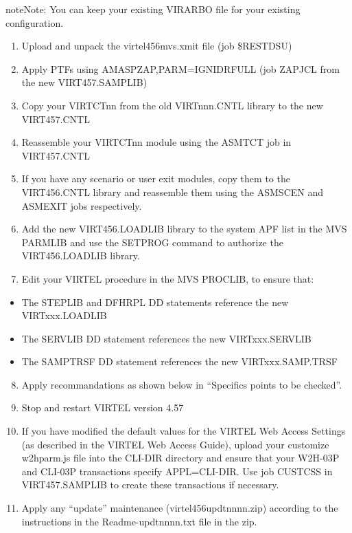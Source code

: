 \documentclass[letterpaper,10pt,english]{sphinxmanual}
\begin{document}
\begin{sphinxadmonition}{note}{Note:}
You can keep your existing VIRARBO file for your existing configuration.
\end{sphinxadmonition}
\begin{enumerate}
\item {} 
Upload and unpack the virtel456mvs.xmit file (job \$RESTDSU)

\item {} 
Apply PTFs using AMASPZAP,PARM=IGNIDRFULL (job ZAPJCL from the new VIRT457.SAMPLIB)

\item {} 
Copy your VIRTCTnn from the old VIRTnnn.CNTL library to the new VIRT457.CNTL

\item {} 
Reassemble your VIRTCTnn module using the ASMTCT job in VIRT457.CNTL

\item {} 
If you have any scenario or user exit modules, copy them to the VIRT456.CNTL library and reassemble them using the ASMSCEN and ASMEXIT jobs respectively.

\item {} 
Add the new VIRT456.LOADLIB library to the system APF list in the MVS PARMLIB and use the SETPROG command to authorize the VIRT456.LOADLIB library.

\item {} 
Edit your VIRTEL procedure in the MVS PROCLIB, to ensure that:

\end{enumerate}
\begin{itemize}
\item {} 
The STEPLIB and DFHRPL DD statements reference the new VIRTxxx.LOADLIB

\item {} 
The SERVLIB DD statement references the new VIRTxxx.SERVLIB

\item {} 
The SAMPTRSF DD statement references the new VIRTxxx.SAMP.TRSF

\end{itemize}
\begin{enumerate}
\setcounter{enumi}{7}
\item {} 
Apply recommandations as shown below in “Specifics points to be checked”.

\item {} 
Stop and restart VIRTEL version 4.57

\item {} 
If you have modified the default values for the VIRTEL Web Access Settings (as described in the VIRTEL Web Access Guide), upload your customize w2hparm.js file into the CLI-DIR directory and ensure that your W2H-03P and CLI-03P transactions specify APPL=CLI-DIR. Use job CUSTCSS in VIRT457.SAMPLIB to create these transactions if necessary.

\item {} 
Apply any “update” maintenance (virtel456updtnnnn.zip) according to the instructions in the Readme-updtnnnn.txt file in the zip.

\end{enumerate}
\end{document}
